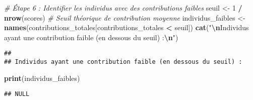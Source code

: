 \documentclass[
]{article}
\newenvironment{Shaded}{\begin{snugshade}}{\end{snugshade}}
\newcommand{\CommentTok}[1]{\textcolor[rgb]{0.56,0.35,0.01}{\textit{#1}}}
\newcommand{\DecValTok}[1]{\textcolor[rgb]{0.00,0.00,0.81}{#1}}
\newcommand{\FunctionTok}[1]{\textcolor[rgb]{0.13,0.29,0.53}{\textbf{#1}}}
\newcommand{\NormalTok}[1]{#1}
\newcommand{\OtherTok}[1]{\textcolor[rgb]{0.56,0.35,0.01}{#1}}
\newcommand{\SpecialCharTok}[1]{\textcolor[rgb]{0.81,0.36,0.00}{\textbf{#1}}}
\newcommand{\StringTok}[1]{\textcolor[rgb]{0.31,0.60,0.02}{#1}}
\begin{document}
\begin{Shaded}
\begin{Highlighting}[]
\CommentTok{\# Étape 6 : Identifier les individus avec des contributions faibles}
\NormalTok{seuil }\OtherTok{\textless{}{-}} \DecValTok{1} \SpecialCharTok{/} \FunctionTok{nrow}\NormalTok{(scores)  }\CommentTok{\# Seuil théorique de contribution moyenne}
\NormalTok{individus\_faibles }\OtherTok{\textless{}{-}} \FunctionTok{names}\NormalTok{(contributions\_totales[contributions\_totales }\SpecialCharTok{\textless{}}\NormalTok{ seuil])}
\FunctionTok{cat}\NormalTok{(}\StringTok{"}\SpecialCharTok{\textbackslash{}n}\StringTok{Individus ayant une contribution faible (en dessous du seuil) :}\SpecialCharTok{\textbackslash{}n}\StringTok{"}\NormalTok{)}
\end{Highlighting}
\end{Shaded}

\begin{verbatim}
## 
## Individus ayant une contribution faible (en dessous du seuil) :
\end{verbatim}

\begin{Shaded}
\begin{Highlighting}[]
\FunctionTok{print}\NormalTok{(individus\_faibles)}
\end{Highlighting}
\end{Shaded}

\begin{verbatim}
## NULL
\end{verbatim}
\end{document}
